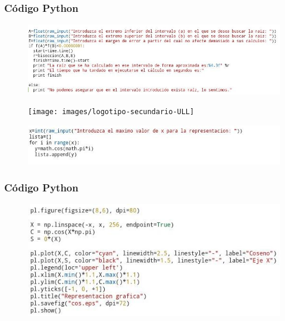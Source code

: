 \documentclass{beamer}
\begin{document}
\begin{frame}
\frametitle{Código \textsf{Python}}

\begin{figure}[b]
\begin{center}
\includegraphics[scale=0.6]{python5.jpeg}
\end{center}
\end{figure}
\begin{figure}[b]\texttt{[image: images/logotipo-secundario-ULL]}\\[0.25cm]
\begin{center}
\includegraphics[scale=0.7]{python3.jpeg}
\end{center}
\end{figure}
\end{frame}

\begin{frame}
\frametitle{Código \textsf{Python}}

\begin{figure}[b]
\begin{center}
\includegraphics[scale=0.75]{python4.jpeg}
\end{center}
\end{figure}
\end{frame}
\end{document}
